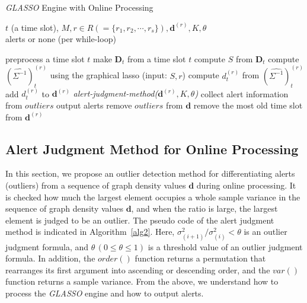 \documentclass[conference]{IEEEtran}
\begin{document}
\begin{algorithm}[tb]
\caption{{\it GLASSO} Engine with Online Processing}
\label{alg1}
\begin{algorithmic}[1]
  \REQUIRE $t$ (a time slot), $M, r \in R ( = \{r_1, r_2, \cdots, r_s\} ), \bm{d}^{(r)}, K, \theta$\\
  \ENSURE alerts or none (per while-loop)

    \STATE preprocess a time slot $t$
    \STATE make $\bm{D}_t$ from a time slot $t$
    \STATE compute $S$ from $\bm{D}_t$
      \STATE compute ${(\hat{\Sigma^{-1}})}_t^{(r)}$ using the graphical lasso (input: $S,r$)
      \STATE compute $d_t^{(r)}$ from ${(\hat{\Sigma^{-1}})}_t^{(r)}$
      \STATE add $d_t^{(r)}$ to $\bm{d}^{(r)}$
         {\it alert-judgment-method($\bm{d}^{(r)}, K, \theta$)}
          \STATE collect alert information from $outliers$
          \STATE output alerts
          \STATE remove $outliers$ from $\bm{d}$
        \ELSE
          \STATE remove the most old time slot from $\bm{d}^{(r)}$
        \ENDIF
  		\ENDIF
  	\ENDFOR
  \ENDWHILE
\end{algorithmic}
\end{algorithm}





\subsection{Alert Judgment Method for Online Processing}
In this section, we propose an outlier detection method for differentiating alerts (outliers) from a sequence of graph density values $\bm{d}$ during online processing.
It is checked how much the largest element occupies a whole sample variance in the sequence of graph density values $\bm{d}$, and when the ratio is large, the largest element is judged to be an outlier.
The pseudo code of the alert judgment method is indicated in Algorithm~\ref{alg2}.
Here, $\sigma^{2}_{(i+1)}/\sigma^{2}_{(i)}<\theta$ is an outlier judgment formula, and $\theta \, (0\leq \theta \leq 1)$ is a threshold value of an outlier judgment formula.
In addition, the $order()$ function returns a permutation that rearranges its first argument into ascending or descending order, and the $var()$ function returns a sample variance.
From the above, we understand how to process the {\it GLASSO} engine and how to output alerts.
\end{document}
